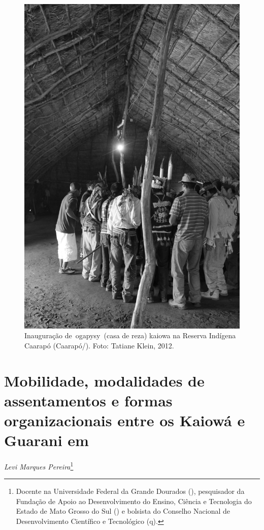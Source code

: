 \begin{figure}
  \centering
 \includegraphics[width=\textwidth]{./img/GUARANIS-img6.jpg}	
  \hfill
  \caption{Inauguração de~ogapysy~(casa de reza) kaiowa na Reserva Indígena
Caarapó (Caarapó/). Foto: Tatiane Klein, 2012.}
\end{figure}

 

\chapter{Mobilidade, modalidades de assentamentos e formas organizacionais entre
os Kaiowá e Guarani em }
\begin{flushright}
\emph{Levi Marques Pereira}\footnote{Docente na Universidade Federal da
Grande Dourados (), pesquisador da Fundação de Apoio ao Desenvolvimento do Ensino, Ciência e Tecnologia do Estado de Mato Grosso do Sul () e bolsista do Conselho Nacional de Desenvolvimento Científico e Tecnológico (q).} 
\end{flushright}

